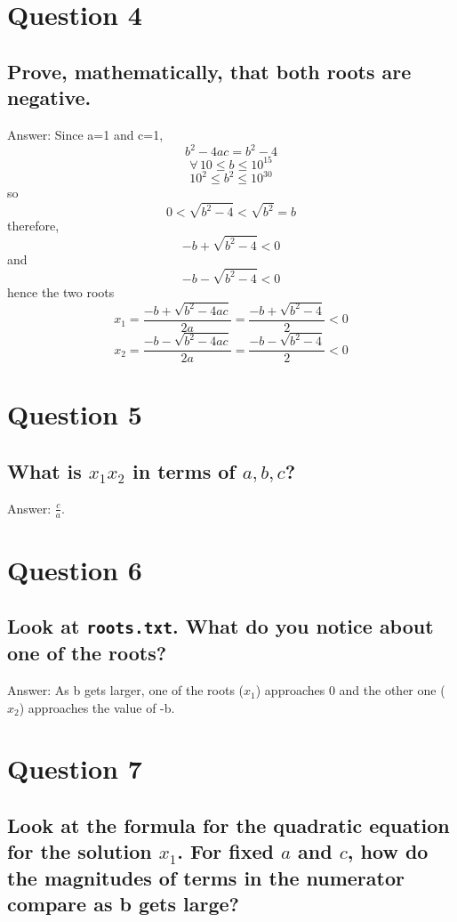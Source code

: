 \documentclass{article}
\begin{document}
\section*{Question 4}
\subsection*{Prove, mathematically, that both roots are negative.}

Answer: Since a=1 and c=1,
$$b^{2}-4ac = b^{2}-4$$
$$\forall \, 10 \leq b \leq 10^{15}$$
$$10^{2} \leq b^{2} \leq 10^{30}$$ 
so
$$0 < \sqrt{b^{2}-4} < \sqrt{b^{2}}=b$$
therefore,
$$-b+\sqrt{b^{2}-4} < 0$$ and
$$-b-\sqrt{b^{2}-4} < 0$$
hence the two roots
$$x_1=\frac{-b+\sqrt{b^{2}-4ac}}{2a}=\frac{-b+\sqrt{b^{2}-4}}{2} < 0$$
$$x_2=\frac{-b-\sqrt{b^{2}-4ac}}{2a}=\frac{-b-\sqrt{b^{2}-4}}{2} < 0$$


\section*{Question 5}
\subsection*{What is $x_1 x_2$ in terms of $a, b, c$?}

Answer: $\frac{c}{a}$.


\section*{Question 6}
\subsection*{Look at \texttt{roots.txt}.  What do you notice about one of the
             roots?}

Answer: As b gets larger, one of the roots ($x_1$) approaches 0 and the other one ($x_2$) approaches the value of -b.


\section*{Question 7}
\subsection*{Look at the formula for the quadratic equation for the
             solution $x_1$. For fixed $a$ and $c$, how do the magnitudes of
             terms in the numerator compare as b gets large?}
\end{document}

